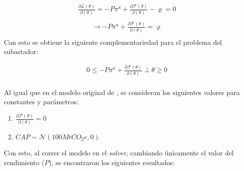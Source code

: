 \begin{equation}
\begin{array}{rrclcl}
    \frac{\partial\mathcal{L}(\theta)}{\partial (\theta)}=-P\pi^a+\frac{\partial\mathcal{F}(\theta)}{\partial(\theta)}-\varrho=0 \label{lag1}\\
\end{array}
\end{equation}
\begin{equation}
\begin{array}{rrclcl}
    \rightarrow -P\pi^a+\frac{\partial\mathcal{F}(\theta)}{\partial(\theta)}=\varrho \label{lag11}\\
\end{array}
\end{equation}
Con esto se obtiene la siguiente complementariedad para el problema del subastador:

\begin{equation}
\begin{array}{rrclcl}
    0\leq -P\pi^a+\frac{\partial\mathcal{F}(\theta)}{\partial(\theta)}\perp \theta \geq 0 \label{compllag1}\\
\end{array}
\end{equation}

Al igual que en el modelo original de , se consideran los siguientes valores para constantes y parámetros:
\begin{enumerate}
    \item $\frac{\partial\mathcal{F}(\theta)}{\partial(\theta)}=0$
    \item $CAP\sim \mathcal{N}(100MtCO_{2}e,0)$
\end{enumerate}

Con esto, al correr el modelo en el \textit{solver}, cambiando únicamente el valor del rendimiento ($P$), se encontraron los siguientes resultados:

